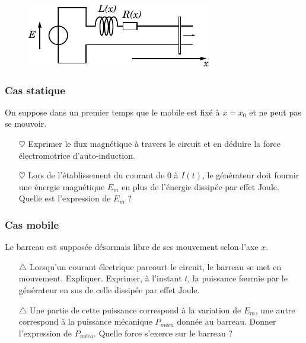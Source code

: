 \documentclass{report}
\begin{document}
\begin{figure}[h!]
\centering
		\includegraphics[scale=1]{induction1.pdf}
\end{figure}

\subsubsection*{Cas statique}

On suppose dans un premier temps que le mobile est fixé à $x=x_0$ et ne peut pas se mouvoir. 

\begin{itemize}

	\item[$\heartsuit$] Exprimer le flux magnétique à travers le circuit et en déduire la force électromotrice d'auto-induction.
	
	\item[$\heartsuit$] Lors de l'établissement du courant de 0 à $I(t)$, le générateur doit fournir une énergie magnétique $E_m$ en plus de l'énergie dissipée par effet Joule. Quelle est l'expression de $E_m$ ?

\end{itemize}

\subsubsection*{Cas mobile}

Le barreau est supposée désormais libre de ses mouvement selon l'axe $x$. 

\begin{itemize}

	\item[$\triangle$] Lorsqu'un courant électrique parcourt le circuit, le barreau se met en mouvement. Expliquer. Exprimer, à l'instant $t$, la puissance fournie par le générateur en sus de celle dissipée par effet Joule. 
	
	\item[$\triangle$] Une partie de cette puissance correspond à la variation de $E_m$, une autre correspond à la puissance mécanique $P_{méca}$ donnée au barreau. Donner l'expression de $P_{méca}$. Quelle force s'exerce sur le barreau ?

\end{itemize}
\end{document}
